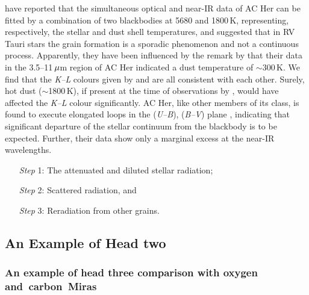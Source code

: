 \documentclass[useAMS,usenatbib]{biom}
\begin{document}
\citet{b9} have reported that the simultaneous optical and near-IR
data of AC Her can be fitted by a combination of two blackbodies
at 5680 and 1800\,K, representing, respectively, the stellar and
dust shell temperatures, and suggested that in RV Tauri stars the
grain formation is a sporadic phenomenon and not a continuous
process. Apparently, they have been influenced by the remark by
\citet{b7} that their data in the 3.5--11$\,\mu$m region of AC
Her indicated a dust temperature of $\sim$300\,K. We find that the
{\it K--L\/} colours given by \citet{b5} and
\citet{b9} are all consistent with each other. Surely, hot dust
($\sim$1800\,K), if present at the time of observations by
\citet{b9}, would have affected the {\it K--L\/} colour
significantly. AC Her, like other members of its class, is found
to execute elongated loops in the ({\it U--B\/}), ({\it B--V\/})
plane \citep{b20}, indicating that significant departure of the
stellar continuum from the blackbody is to be expected. Further,
their data show only a marginal excess at the near-IR wavelengths.\vspace*{-4pt}
\begin{enumerate}
\item[{\it Step} 1:] The attenuated and diluted stellar radiation;
\item[{\it Step} 2:] Scattered radiation, and
\item[{\it Step} 3:] Reradiation from other grains.\vspace*{-8pt}
\end{enumerate}


\enlargethispage{-2pt}

\subsection{An Example of Head two}
\subsubsection{An example of head three comparison with oxygen and~carbon~Miras}
\end{document}
